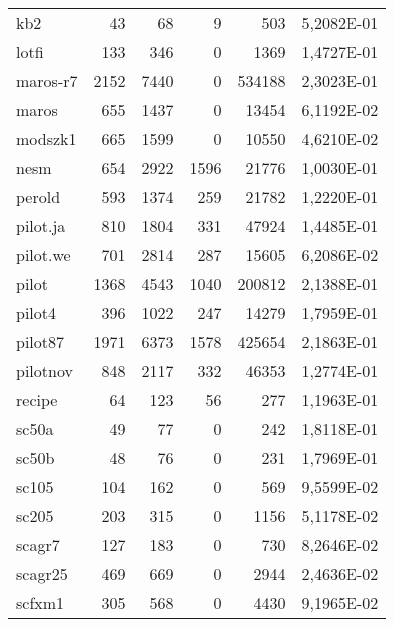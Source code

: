 {\begin{longtable}{>{\ttfamily}lrrrrc}
kb2          		& 43        & 68        & 9           & 503      & \num{5,2082E-01} \\
lotfi        		& 133       & 346       & 0           & 1369     & \num{1,4727E-01} \\
maros-r7     		& 2152      & 7440      & 0           & 534188   & \num{2,3023E-01} \\
maros        		& 655       & 1437      & 0           & 13454    & \num{6,1192E-02} \\
modszk1      		& 665       & 1599      & 0           & 10550    & \num{4,6210E-02} \\
nesm         		& 654       & 2922      & 1596        & 21776    & \num{1,0030E-01} \\
perold       		& 593       & 1374      & 259         & 21782    & \num{1,2220E-01} \\
pilot.ja     		& 810       & 1804      & 331         & 47924    & \num{1,4485E-01} \\
pilot.we     		& 701       & 2814      & 287         & 15605    & \num{6,2086E-02} \\
pilot        		& 1368      & 4543      & 1040        & 200812   & \num{2,1388E-01} \\
pilot4       		& 396       & 1022      & 247         & 14279    & \num{1,7959E-01} \\
pilot87      		& 1971      & 6373      & 1578        & 425654   & \num{2,1863E-01} \\
pilotnov     		& 848       & 2117      & 332         & 46353    & \num{1,2774E-01} \\
recipe       		& 64        & 123       & 56          & 277      & \num{1,1963E-01} \\
sc50a        		& 49        & 77        & 0           & 242      & \num{1,8118E-01} \\
sc50b        		& 48        & 76        & 0           & 231      & \num{1,7969E-01} \\
sc105        		& 104       & 162       & 0           & 569      & \num{9,5599E-02} \\
sc205        		& 203       & 315       & 0           & 1156     & \num{5,1178E-02} \\
scagr7       		& 127       & 183       & 0           & 730      & \num{8,2646E-02} \\
scagr25      		& 469       & 669       & 0           & 2944     & \num{2,4636E-02} \\
scfxm1       		& 305       & 568       & 0           & 4430     & \num{9,1965E-02} \\

\end{longtable}}
